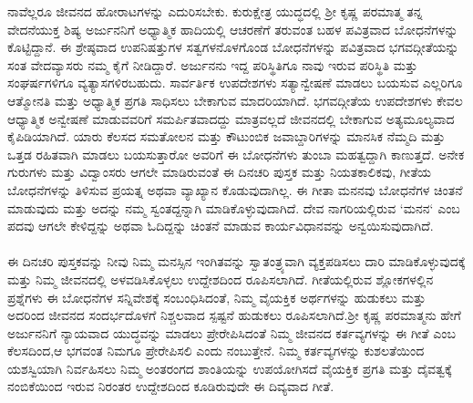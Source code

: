 \indent ನಾವೆಲ್ಲರೂ ಜೀವನದ ಹೋರಾಟಗಳನ್ನು ಎದುರಿಸಬೇಕು. ಕುರುಕ್ಷೇತ್ರ ಯುದ್ಧದಲ್ಲಿ ಶ್ರೀ ಕೃಷ್ಣ ಪರಮಾತ್ಮ ತನ್ನ ವೇದನೆಯುಕ್ತ ಶಿಷ್ಯ ಅರ್ಜುನನಿಗೆ ಅಧ್ಯಾತ್ಮಿಕ ಹಾದಿಯಲ್ಲಿ ಆಚರಣೆಗೆ ತರುವಂತ ಬಹಳ ಪವಿತ್ರವಾದ ಬೋಧನೆಗಳನ್ನು ಕೊಟ್ಟಿದ್ದಾನೆ. ಈ ಶ್ರೇಷ್ಠವಾದ ಉಪನಿಷತ್ತುಗಳ ಸತ್ವಗಳನೊಳಗೊಂಡ  ಬೋಧನೆಗಳನ್ನು ಪವಿತ್ರವಾದ ಭಗವದ್ಗೀತೆಯನ್ನು ಸಂತ ವೇದವ್ಯಾಸರು ನಮ್ಮ ಕೈಗೆ ನೀಡಿದ್ದಾರೆ.
 ಅರ್ಜುನನು ಇದ್ದ ಪರಿಸ್ಥಿತಿಗೂ ನಾವು ಇರುವ ಪರಿಸ್ಥಿತಿ ಮತ್ತು ಸಂಘರ್ಷಗಳಿಗೂ ವ್ಯತ್ಯಾಸಗಳಿರಬಹುದು. ಸಾರ್ವರ್ತಿಕ ಉಪದೇಶಗಳು ಸತ್ಯಾನ್ವೇಷಣೆ ಮಾಡಲು ಬಯಸುವ ಎಲ್ಲರಿಗೂ ಆತ್ಮೋನತಿ  ಮತ್ತು ಅಧ್ಯಾತ್ಮಿಕ ಪ್ರಗತಿ ಸಾಧಿಸಲು ಬೇಕಾಗುವ ಮಾದರಿಯಾಗಿದೆ.
 ಭಗವದ್ಗೀತೆಯ ಉಪದೇಶಗಳು ಕೇವಲ ಆಧ್ಯಾತ್ಮಿಕ ಅನ್ವೇಷಣೆ ಮಾಡುವವರಿಗೆ ಸಮರ್ಪಿತವಾದದ್ದು ಮಾತ್ರವಲ್ಲದೆ ಜೀವನದಲ್ಲಿ ಬೇಕಾಗುವ ಅತ್ಯಮೂಲ್ಯವಾದ ಕೈಪಿಡಿಯಾಗಿದೆ. ಯಾರು ಕೆಲಸದ ಸಮತೋಲನ ಮತ್ತು ಕೌಟುಂಬಿಕ ಜವಾಬ್ದಾರಿಗಳನ್ನು ಮಾನಸಿಕ ನೆಮ್ಮದಿ ಮತ್ತು ಒತ್ತಡ ರಹಿತವಾಗಿ ಮಾಡಲು ಬಯಸುತ್ತಾರೋ ಅವರಿಗೆ ಈ ಬೋಧನೆಗಳು ತುಂಬಾ ಮಹತ್ವದ್ದಾಗಿ ಕಾಣುತ್ತದೆ.
 ಅನೇಕ ಗುರುಗಳು ಮತ್ತು ವಿದ್ವಾಂಸರು ಆಗಲೇ ಮಾಡಿರುವಂತೆ ಈ ದಿನಚರಿ ಪುಸ್ತಕ ಮತ್ತು ನಿಯತಕಾಲಿಕವು, ಗೀತೆಯ ಬೋಧನೆಗಳನ್ನು ತಿಳಿಸುವ ಪ್ರಯತ್ನ ಅಥವಾ ವ್ಯಾಖ್ಯಾನ ಕೊಡುವುದಾಗಿಲ್ಲ. ಈ ಗೀತಾ ಮನನವು ಬೋಧನೆಗಳ ಚಿಂತನೆ ಮಾಡುವುದು ಮತ್ತು ಅದನ್ನು ನಮ್ಮ ಸ್ವಂತದ್ದನ್ನಾಗಿ ಮಾಡಿಕೊಳ್ಳುವುದಾಗಿದೆ. ದೇವ ನಾಗರಿಯಲ್ಲಿರುವ `ಮನನ` ಎಂಬ ಪದವು ಆಗಲೇ ಕೇಳಿದ್ದನ್ನು ಅಥವಾ ಓದಿದ್ದನ್ನು ಚಿಂತನೆ ಮಾಡುವ ಕಾರ್ಯವಿಧಾನವನ್ನು ಅನ್ವಯಿಸುವುದಾಗಿದೆ.\\
\\
 ಈ ದಿನಚರಿ ಪುಸ್ತಕವನ್ನು ನೀವು ನಿಮ್ಮ ಮನಸ್ಸಿನ ಇಂಗಿತವನ್ನು ಸ್ವಾತಂತ್ರ್ಯವಾಗಿ ವ್ಯಕ್ತಪಡಿಸಲು ದಾರಿ ಮಾಡಿಕೊಳ್ಳುವುದಕ್ಕೆ ಮತ್ತು ನಿಮ್ಮ ಜೀವನದಲ್ಲಿ ಅಳವಡಿಸಿಕೊಳ್ಳಲು ಉದ್ದೇಶದಿಂದ ರೂಪಿಸಲಾಗಿದೆ. ಗೀತೆಯಲ್ಲಿರುವ ಶ್ಲೋಕಗಳಲ್ಲಿನ ಪ್ರಶ್ನೆಗಳು ಈ ಬೋಧನೆಗಳ ಸನ್ನಿವೇಶಕ್ಕೆ ಸಂಬಂಧಿಸಿದಂತೆ, ನಿಮ್ಮ ವೈಯಕ್ತಿಕ ಅರ್ಥಗಳನ್ನು ಹುಡುಕಲು ಮತ್ತು ಅದರಿಂದ ಜೀವನದ ಸಂದರ್ಭದೊಳಗೆ ನಿಶ್ಚಲವಾದ ಸ್ಪಷ್ಟನೆ ಹುಡುಕಲು ರೂಪಿಸಲಾಗಿದೆ.ಶ್ರೀ ಕೃಷ್ಣ ಪರಮಾತ್ಮನು ಹೇಗೆ ಅರ್ಜುನನಿಗೆ ನ್ಯಾಯವಾದ ಯುದ್ಧವನ್ನು ಮಾಡಲು ಪ್ರೇರೇಪಿಸಿದಂತೆ ನಿಮ್ಮ ಜೀವನದ ಕರ್ತವ್ಯಗಳನ್ನು ಈ ಗೀತೆ ಎಂಬ ಕೆಲಸದಿಂದ,ಆ ಭಗವಂತ ನಿಮಗೂ ಪ್ರೇರೇಪಿಸಲಿ ಎಂದು ನಂಬುತ್ತೇನೆ. ನಿಮ್ಮ ಕರ್ತವ್ಯಗಳನ್ನು ಕುಶಲತೆಯಿಂದ ಯಶಸ್ವಿಯಾಗಿ ನಿರ್ವಹಿಸಲು ನಿಮ್ಮ ಅಂತರಂಗದ ಶಾಂತಿಯನ್ನು ಉಪಯೋಗಿಸದೆ ವೈಯಕ್ತಿಕ ಪ್ರಗತಿ ಮತ್ತು ದೈವತ್ವಕ್ಕೆ ನಂಬಿಕೆಯಿಂದ ಇರುವ ನಿರಂತರ ಉದ್ದೇಶದಿಂದ ಕೂಡಿರುವುದೇ ಈ ದಿವ್ಯವಾದ ಗೀತೆ.

